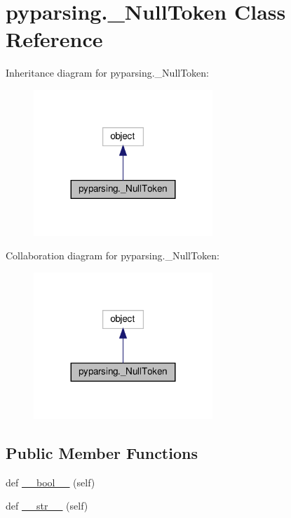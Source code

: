 \hypertarget{classpyparsing_1_1__NullToken}{}\section{pyparsing.\+\_\+\+Null\+Token Class Reference}
\label{classpyparsing_1_1__NullToken}


Inheritance diagram for pyparsing.\+\_\+\+Null\+Token\+:
\nopagebreak
\begin{figure}[H]
\begin{center}
\leavevmode
\includegraphics[width=191pt]{classpyparsing_1_1__NullToken__inherit__graph}
\end{center}
\end{figure}


Collaboration diagram for pyparsing.\+\_\+\+Null\+Token\+:
\nopagebreak
\begin{figure}[H]
\begin{center}
\leavevmode
\includegraphics[width=191pt]{classpyparsing_1_1__NullToken__coll__graph}
\end{center}
\end{figure}
\subsection*{Public Member Functions}
\begin{DoxyCompactItemize}
\item 
def \hyperlink{classpyparsing_1_1__NullToken_a4f8cbc8c4d7624e5157680a4355522ec}{\+\_\+\+\_\+bool\+\_\+\+\_\+} (self)
\item 
def \hyperlink{classpyparsing_1_1__NullToken_a62f1ce32b50993a94119ef34c0f9dab1}{\+\_\+\+\_\+str\+\_\+\+\_\+} (self)
\end{DoxyCompactItemize}


